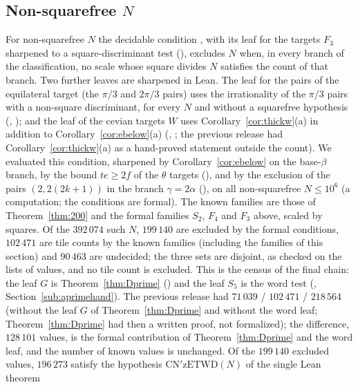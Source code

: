 \documentclass[11pt,reqno]{amsart}
\theoremstyle{plain}
\theoremstyle{definition}
\begin{document}
\subsection{Non-squarefree $N$}
For non-squarefree $N$ the decidable condition , with its leaf for the
targets $F_3$ sharpened to a square-discriminant test (), excludes $N$ when, in
every branch of the classification, no scale whose square divides $N$ satisfies the count of that branch. Two further leaves
are sharpened in Lean. The leaf for the pairs of the equilateral target (the $\pi/3$ and $2\pi/3$ pairs) uses the
irrationality of the $\pi/3$ pairs with a non-square discriminant, for every $N$ and without a squarefree hypothesis
(, ); and the leaf of the cevian targets
$W$ uses Corollary~\ref{cor:thickw}(a) in addition to Corollary~\ref{cor:ebelow}(a)
(, ; the previous release had
Corollary~\ref{cor:thickw}(a) as a hand-proved statement outside the count). We evaluated this condition, sharpened by
Corollary~\ref{cor:ebelow} on the base-$\beta$ branch, by the bound $te\ge2f$
of the $\theta$ targets (), and by the exclusion of the pairs $(2,2(2k+1))$ in the
branch $\gamma=2\alpha$ (), on all non-squarefree $N\le10^6$ (a computation; the conditions are formal).
The known families are those of Theorem~\ref{thm:200} and the formal families $S_2$, $F_4$ and $F_3$ above, scaled by squares.
Of the $392\,074$ such $N$, $199\,140$ are excluded by the formal conditions, $102\,471$ are tile counts by the known families
(including the families of this section) and $90\,463$ are undecided; the three sets are disjoint, as checked on the
lists of values, and no tile count is excluded. This is the census of the final chain: the leaf $G$ is Theorem~\ref{thm:Dprime}
() and the leaf $S_5$ is the word test (, Section~\ref{sub:aprimehand}). The previous release had
$71\,039$ / $102\,471$ / $218\,564$ (without the leaf $G$ of Theorem~\ref{thm:Dprime} and without the word leaf; Theorem~\ref{thm:Dprime} had then a written proof, not formalized); the
difference, $128\,101$ values, is the formal contribution of Theorem~\ref{thm:Dprime} and the word leaf, and the number of known values is unchanged. Of the $199\,140$ excluded values, $196\,273$ satisfy the hypothesis $\mathrm{CN'zETWD}(N)$ of the single Lean theorem
\end{document}
